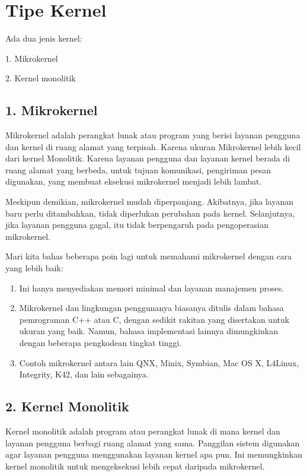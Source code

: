 	\vskip0.5cm

	\section*{Tipe Kernel}
	
	Ada dua jenis kernel:
	
	1. Mikrokernel
	
	2. Kernel monolitik
	
	\vskip0.5cm
	
	\subsection*{1. Mikrokernel}
	
	Mikrokernel adalah perangkat lunak atau program yang berisi layanan pengguna dan kernel di ruang alamat yang terpisah. Karena ukuran Mikrokernel lebih kecil dari kernel Monolitik. Karena layanan pengguna dan layanan kernel berada di ruang alamat yang berbeda, untuk tujuan komunikasi, pengiriman pesan digunakan, yang membuat eksekusi mikrokernel menjadi lebih lambat.
	
	Meskipun demikian, mikrokernel mudah diperpanjang. Akibatnya, jika layanan baru perlu ditambahkan, tidak diperlukan perubahan pada kernel. Selanjutnya, jika layanan pengguna gagal, itu tidak berpengaruh pada pengoperasian mikrokernel.
	
	Mari kita bahas beberapa poin lagi untuk memahami mikrokernel dengan cara yang lebih baik: 
	
	\begin{enumerate}
		\item Ini hanya menyediakan memori minimal dan layanan manajemen proses.
		
		\item Mikrokernel dan lingkungan penggunanya biasanya ditulis dalam bahasa pemrograman C++ atau C, dengan sedikit rakitan yang disertakan untuk ukuran yang baik. Namun, bahasa implementasi lainnya dimungkinkan dengan beberapa pengkodean tingkat tinggi.
		
		\item Contoh mikrokernel antara lain QNX, Minix, Symbian, Mac OS X, L4Linux, Integrity, K42, dan lain sebagainya.
	\end{enumerate}

	\vskip0.5cm
	
	\subsection*{2. Kernel Monolitik}
	Kernel monolitik adalah program atau perangkat lunak di mana kernel dan layanan pengguna berbagi ruang alamat yang sama. Panggilan sistem digunakan agar layanan pengguna menggunakan layanan kernel apa pun. Ini memungkinkan kernel monolitik untuk mengeksekusi lebih cepat daripada mikrokernel.
	
